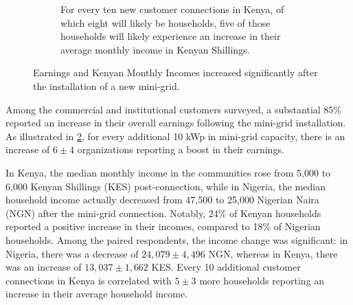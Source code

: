 \begin{figure}[t]
\begin{subfigure}[t]{0.48\textwidth}
        \caption{For every ten new customer connections in Kenya, of which eight will likely be households, five of those households will likely experience an increase in their average monthly income in Kenyan Shillings.}
        \label{fig:kenya_incomes}
    \end{subfigure}
    \caption{Earnings and Kenyan Monthly Incomes increased significantly after the installation of a new mini-grid.}
    \label{fig:economic_improvement}
\end{figure}
Among the commercial and institutional customers surveyed, a substantial 85\% reported an increase in their overall earnings following the mini-grid installation. As illustrated in \cref{fig:economic_improvement}, for every additional 10 kWp in mini-grid capacity, there is an increase of $6\pm4$ organizations reporting a boost in their earnings. 

In Kenya, the median monthly income in the communities rose from 5,000 to 6,000 Kenyan Shillings (KES) post-connection, while in Nigeria, the median household income actually decreased from 47,500 to 25,000 Nigerian Naira (NGN) after the mini-grid connection. Notably, 24\% of Kenyan households reported a positive increase in their incomes, compared to 18\% of Nigerian households. Among the paired respondents, the income change was significant: in Nigeria, there was a decrease of $24,079\pm4,496$ NGN, whereas in Kenya, there was an increase of $13,037\pm1,662$ KES. Every 10 additional customer connections in Kenya is correlated with $5\pm3$ more households reporting an increase in their average household income.

